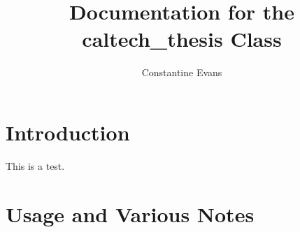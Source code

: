 \documentclass[thesisdraft]{caltech_thesis}
\author{Constantine Evans}
\title{Documentation for the {caltech\_thesis} Class}
\begin{document}
\maketitle

\tableofcontents

\mainmatter

\chapter{Introduction}

This is a test.

\chapter{Usage and Various Notes}
\end{document}
